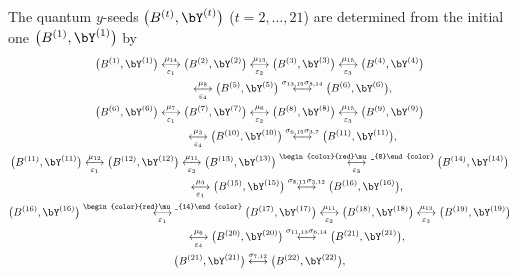 The quantum $y$-seeds $\bigl(B^{(t)}, \bY^{(t)}\bigr)$ ($t=2,\dotsc, 21$) are
determined from the initial one $\bigl(B^{(1)},\allowbreak \bY^{(1)}\bigr) $ by
\begin{gather}
\bigl(B^{(1)}, \bY^{(1)}\bigr) \underset{\varepsilon_1}{\overset{\mu_{14}}{\longleftrightarrow}}
\bigl(B^{(2)}, \bY^{(2)}\bigr) \underset{\varepsilon_2}{\overset{\mu_{13}}{\longleftrightarrow}}
\bigl(B^{(3)}, \bY^{(3)}\bigr) \underset{\varepsilon_3}{\overset{\mu_{15}}{\longleftrightarrow}}
\bigl(B^{(4)}, \bY^{(4)}\bigr)\nonumber
\\
\phantom{\bigl(B^{(1)}, \bY^{(1)}\bigr)}{}
 \underset{\varepsilon_4}{\overset{\mu_{8}}{\longleftrightarrow}}
\bigl(B^{(5)}, \bY^{(5)}\bigr) \overset{\sigma_{13,15}\sigma_{8,14}}{\longleftrightarrow}
\bigl(B^{(6)}, \bY^{(6)}\bigr),\nonumber
\\
\bigl(B^{(6)}, \bY^{(6)}\bigr) \underset{\varepsilon_1}{\overset{\mu_{7}}{\longleftrightarrow}}
\bigl(B^{(7)}, \bY^{(7)}\bigr) \underset{\varepsilon_2}{\overset{\mu_{6}}{\longleftrightarrow}}
\bigl(B^{(8)}, \bY^{(8)}\bigr) \underset{\varepsilon_3}{\overset{\mu_{15}}{\longleftrightarrow}}
\bigl(B^{(9)}, \bY^{(9)}\bigr)\nonumber
\\
\phantom{\bigl(B^{(6)}, \bY^{(6)}\bigr)}{}
\underset{\varepsilon_4}{\overset{\mu_{3}}{\longleftrightarrow} }
\bigl(B^{(10)}, \bY^{(10)}\bigr) \overset{\sigma_{6,15}\sigma_{3,7}}{\longleftrightarrow}
\bigl(B^{(11)}, \bY^{(11)}\bigr),\nonumber
\\
\bigl(B^{(11)}, \bY^{(11)}\bigr) \underset{\varepsilon_1}{\overset{\mu_{12}}{\longleftrightarrow} }
\bigl(B^{(12)}, \bY^{(12)}\bigr) \underset{\varepsilon_2}{\overset{\mu_{11}}{\longleftrightarrow} }
\bigl(B^{(13)}, \bY^{(13)}\bigr) \underset{\varepsilon_3}{\overset{\begin{color}{red}\mu_{8}\end{color}}{\longleftrightarrow} }
\bigl(B^{(14)}, \bY^{(14)}\bigr)\nonumber
\\
\phantom{\bigl(B^{(11)}, \bY^{(11)}\bigr)}{}
 \underset{\varepsilon_4}{ \overset{\mu_{3}}{\longleftrightarrow}}
\bigl(B^{(15)}, \bY^{(15)}\bigr) \overset{\sigma_{8,11}\sigma_{3,12}}{\longleftrightarrow}
\bigl(B^{(16)}, \bY^{(16)}\bigr),\nonumber
\\
\bigl(B^{(16)}, \bY^{(16)}\bigr) \underset{\varepsilon_1}{\overset{\begin{color}{red}\mu_{14}\end{color}}{\longleftrightarrow}}
\bigl(B^{(17)}, \bY^{(17)}\bigr) \underset{\varepsilon_2}{\overset{\mu_{11}}{\longleftrightarrow}}
\bigl(B^{(18)}, \bY^{(18)}\bigr) \underset{\varepsilon_3}{\overset{\mu_{13}}{\longleftrightarrow}}
\bigl(B^{(19)}, \bY^{(19)}\bigr)\nonumber
\\
\phantom{\bigl(B^{(16)}, \bY^{(16)}\bigr) }{}
\underset{\varepsilon_4}{ \overset{\mu_{6}}{\longleftrightarrow}}
\bigl(B^{(20)}, \bY^{(20)}\bigr) \overset{\sigma_{11,13}\sigma_{6,14}}{\longleftrightarrow}
\bigl(B^{(21)}, \bY^{(21)}\bigr),\nonumber
\\
\bigl(B^{(21)}, \bY^{(21)}\bigr) \overset{\sigma_{7,12}}{\longleftrightarrow}
\bigl(B^{(22)}, \bY^{(22)}\bigr),\label{b21L}
\end{gather}
